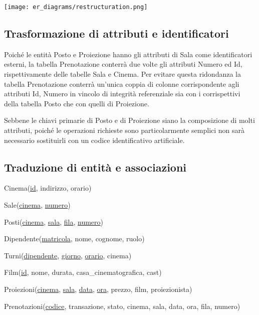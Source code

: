 \texttt{[image: er\_diagrams/restructuration.png]}

\subsection*{Trasformazione di attributi e identificatori}
%
%

Poiché le entità Posto e Proiezione hanno gli attributi di Sala come
identificatori esterni, la tabella Prenotazione conterrà due volte gli attributi
Numero ed Id, rispettivamente delle tabelle Sala e Cinema.
Per evitare questa ridondanza la tabella Prenotazione conterrà un'unica coppia
di colonne corrispondente agli attributi Id, Numero in vincolo di integrità
referenziale sia con i corrispettivi della tabella Posto che con quelli di
Proiezione.

Sebbene le chiavi primarie di Posto e di Proiezione siano la composizione di
molti attributi, poiché le operazioni richieste sono particolarmente semplici
non sarà necessario sostituirli con un codice identificativo artificiale.

\pagebreak
\subsection*{Traduzione di entità e associazioni}
%
%

Cinema(\underline{id}, indirizzo, orario)

Sale(\underline{cinema}, \underline{numero})

Posti(\underline{cinema},
\underline{sala},
\underline{fila},
\underline{numero})

Dipendente(\underline{matricola}, nome, cognome, ruolo)

Turni(\underline{dipendente}, \underline{giorno}, \underline{orario}, cinema)

Film(\underline{id}, nome, durata, casa\_cinematografica, cast)

Proiezioni(\underline{cinema},
\underline{sala},
\underline{data},
\underline{ora},
prezzo,
film,
proiezionista)

Prenotazioni(\underline{codice},
transazione,
stato,
cinema,
sala,
data,
ora,
fila,
numero)

